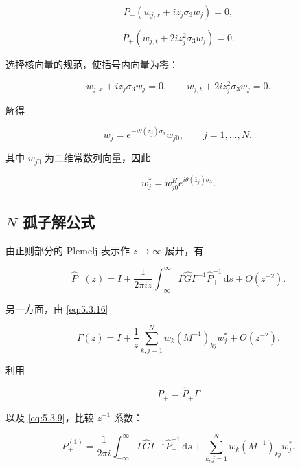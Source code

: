\documentclass[
    lang=cn,
    scheme=chinese,
    mode=simple,
    device=normal,
    color=blue,
    math=cm,
    thmcnt=section,
    12pt,
    nowatermark
]{elegantbook}
\begin{document}
\[
    P_+\left(w_{j,x}+iz_j\sigma_3w_j\right)=0,
\]

\[
    P_+\left(w_{j,t}+2iz_j^2\sigma_3w_j\right)=0.
\]

选择核向量的规范，使括号内向量为零：

\[
    w_{j,x}+iz_j\sigma_3w_j=0,
    \qquad
    w_{j,t}+2iz_j^2\sigma_3w_j=0.
\]

解得

\begin{equation}
    w_j
    =
    e^{-i\theta(z_j)\sigma_3}w_{j0},
    \qquad
    j=1,\ldots,N,
    \tag{5.4.5}
    \label{eq:5.4.5}
\end{equation}

其中 $w_{j0}$ 为二维常数列向量，因此

\begin{equation}
    w_j^*
    =
    w_{j0}^He^{i\theta(\bar z_j)\sigma_3}.
    \tag{5.4.6}
    \label{eq:5.4.6}
\end{equation}

\subsection{\texorpdfstring{$N$}{N} 孤子解公式}

由正则部分的 Plemelj 表示作 $z\to\infty$ 展开，有

\begin{equation}
    \widehat P_+(z)
    =
    I+
    \dfrac{1}{2\pi iz}
    \int_{-\infty}^{\infty}
    \Gamma\widehat G\Gamma^{-1}\widehat P_+^{-1}\,\mathrm ds
    +
    O(z^{-2}).
    \tag{5.4.7}
    \label{eq:5.4.7}
\end{equation}

另一方面，由 \eqref{eq:5.3.16}

\begin{equation}
    \Gamma(z)
    =
    I+
    \dfrac{1}{z}
    \sum\limits_{k,j=1}^{N}
    w_k(M^{-1})_{kj}w_j^*
    +
    O(z^{-2}).
    \tag{5.4.8}
    \label{eq:5.4.8}
\end{equation}

利用

\[
    P_+=\widehat P_+\Gamma
\]

以及 \eqref{eq:5.3.9}，比较 $z^{-1}$ 系数：

\begin{equation}
    P_+^{(1)}
    =
    \dfrac{1}{2\pi i}
    \int_{-\infty}^{\infty}
    \Gamma\widehat G\Gamma^{-1}\widehat P_+^{-1}\,\mathrm ds
    +
    \sum\limits_{k,j=1}^{N}
    w_k(M^{-1})_{kj}w_j^*.
    \tag{5.4.9}
    \label{eq:5.4.9}
\end{equation}
\end{document}
